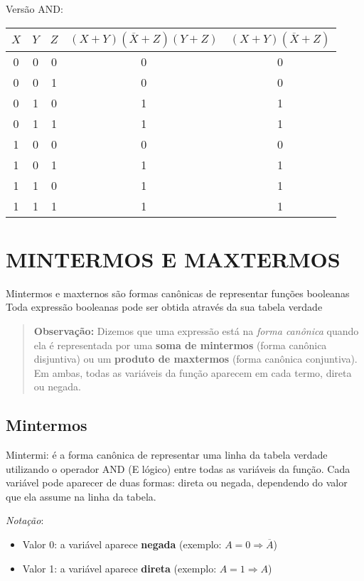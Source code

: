\documentclass[12pt]{article}
\begin{document}
Versão AND:
\begin{center}
\begin{tabular}{|c|c|c|c|c|}
\hline
$X$  & $Y$ & $Z$ &  $(X + Y)(\overline{X} + Z)(Y + Z)$ & $(X + Y)(\overline{X} + Z)$ \\
\hline
0 & 0 & 0 & 0 & 0 \\
0 & 0 & 1 & 0 & 0 \\
0 & 1 & 0 & 1 & 1 \\
0 & 1 & 1 & 1 & 1 \\
1 & 0 & 0 & 0 & 0 \\
1 & 0 & 1 & 1 & 1 \\
1 & 1 & 0 & 1 & 1 \\
1 & 1 & 1 & 1 & 1 \\
\hline
\end{tabular}
\end{center}

\section{MINTERMOS E MAXTERMOS}
Mintermos e maxternos são formas canônicas de representar funções booleanas
Toda expressão booleanas pode ser obtida através da sua tabela verdade
\begin{quote}
\textbf{Observação:} Dizemos que uma expressão está na \textit{forma canônica} quando ela é representada por uma \textbf{soma de mintermos} (forma canônica disjuntiva) ou um \textbf{produto de maxtermos} (forma canônica conjuntiva). Em ambas, todas as variáveis da função aparecem em cada termo, direta ou negada.
\end{quote}

\subsection{Mintermos}
Mintermi: é a forma canônica de representar uma linha da tabela verdade utilizando o operador AND (E lógico) entre todas as variáveis da função.
Cada variável pode aparecer de duas formas: direta ou negada, dependendo do valor que ela assume na linha da tabela.

\textit{Notação}: 
\begin{itemize}
   \item Valor 0: a variável aparece \textbf{negada} (exemplo: $A = 0 \Rightarrow \overline{A}$)
   \item Valor 1: a variável aparece \textbf{direta} (exemplo: $A = 1 \Rightarrow A$)
\end{itemize}
\end{document}
